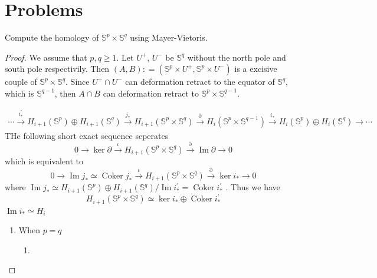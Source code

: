 \documentclass[../main.tex]{subfiles}
\begin{document}
\section{Problems}
\begin{problem}{}{}
Compute the homology of $\mathbb{S}^p \times \mathbb{S}^q$ using Mayer-Vietoris.
\end{problem}
\begin{proof}
   We assume that \( p, q\ge 1  \).   Let \(  U^{+ }  \), \(  U^{-}  \) be  \(  \mathbb{S}^{q}  \) without the north pole and south pole  respectivily.  Then \( \left( A,B \right): =   \left( \mathbb{S}^{p}\times U^{+ },\mathbb{S}^{p}\times U^{-} \right)   \) is a excisive couple of \(  \mathbb{S}^{p}\times \mathbb{S}^{q}  \). Since \(  U^{+ }\cap U^{-}  \)        can deformation retract to the equator of \(  \mathbb{S}^{q}  \), which is \(  \mathbb{S}^{q-1}  \), then  \(  A\cap B  \) can deformation retract to  \(  \mathbb{S}^{p}\times \mathbb{S}^{q-1}  \).    

   \[\begin{array}{l}
\cdots \xrightarrow{i^{\prime} _{*}}  H_{i+ 1}\left( \mathbb{S}^{p} \right)\oplus H_{i+ 1}\left( \mathbb{S}^{q} \right) \xrightarrow{j_*} H_{i+1}(\mathbb{S}^{p}\times \mathbb{S}^{q}) \xrightarrow{\partial} H_i(\mathbb{S}^{p}\times \mathbb{S}^{q-1}) \xrightarrow{i_*} H_i(\mathbb{S}^{p}) \oplus H_i(\mathbb{S}^{q})  \to \cdots 
\end{array}
\] THe following short exact sequence seperates \[
0\to \operatorname{ker} \partial \xrightarrow{\iota }H_{i+ 1}\left( \mathbb{S}^{p}\times \mathbb{S}^{q} \right) \xrightarrow{ \partial } \operatorname{Im} \partial \to 0
\]which is equivalent to  \[
0\to  \operatorname{Im}j_{*} \simeq \operatorname{Coker}j_{*}\xrightarrow{\iota }H_{i+ 1}\left( \mathbb{S}^{p}\times \mathbb{S}^{q} \right)\xrightarrow{ \partial }\operatorname{ker}i_{*}\to 0 
\] where \(  \operatorname{Im}j_{*}\simeq  H_{i+ 1}\left( \mathbb{S}^{p} \right)\oplus H_{i+ 1}\left( \mathbb{S}^{q} \right)/\operatorname{Im}i^{\prime} _{*}    = \operatorname{Coker}i_{*}^{\prime} \) . Thus we have \[
H_{i+ 1}\left( \mathbb{S}^{p}\times \mathbb{S}^{q} \right)\simeq \operatorname{ker}i_{*}\oplus \operatorname{Coker}i_{*}^{\prime}  
\] \( \operatorname{Im}i_{*}\simeq H_{i}   \) 
\begin{enumerate}
    \item When \(  p= q  \) 
    \begin{enumerate}
        \item 
    \end{enumerate}
     
\end{enumerate}

\end{proof}
\end{document}
